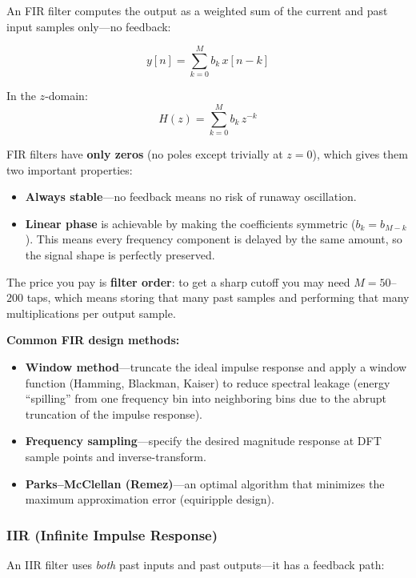 An FIR filter computes the output as a weighted sum of the current and past input
samples only---no feedback:

\begin{equation}
y[n] = \sum_{k=0}^{M} b_k \, x[n-k]
\end{equation}

In the $z$-domain:
\begin{equation}
H(z) = \sum_{k=0}^{M} b_k \, z^{-k}
\end{equation}

FIR filters have \textbf{only zeros} (no poles except trivially at $z = 0$), which
gives them two important properties:
\begin{itemize}
    \item \textbf{Always stable}---no feedback means no risk of runaway oscillation.
    \item \textbf{Linear phase} is achievable by making the coefficients symmetric
          ($b_k = b_{M-k}$). This means every frequency component is delayed by the
          same amount, so the signal shape is perfectly preserved.
\end{itemize}

The price you pay is \textbf{filter order}: to get a sharp cutoff you may need
$M = 50$--$200$ taps, which means storing that many past samples and performing
that many multiplications per output sample.

\textbf{Common FIR design methods:}
\begin{itemize}
    \item \textbf{Window method}---truncate the ideal impulse response and apply a
          window function (Hamming, Blackman, Kaiser) to reduce spectral leakage (energy ``spilling'' from one frequency bin into neighboring bins due to the abrupt truncation of the impulse response).
    \item \textbf{Frequency sampling}---specify the desired magnitude response at
          DFT sample points and inverse-transform.
    \item \textbf{Parks--McClellan (Remez)}---an optimal algorithm that minimizes
          the maximum approximation error (equiripple design).
\end{itemize}

\subsubsection{IIR (Infinite Impulse Response)}

An IIR filter uses \textit{both} past inputs and past outputs---it has a feedback path:

